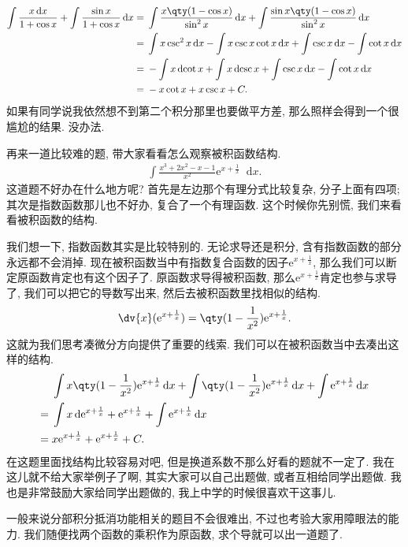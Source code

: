 \documentclass{ctexbook}
\newcommand{\e}{\mathrm{e}}
\newcommand*{\dif}{\mathop{}\!\mathrm{d}}
\begin{document}
{\begin{align*}
\int\frac{x\dif{x}}{1+\cos{x}}+\int\frac{\sin{x}}{1+\cos{x}}\dif{x}={}&\int\frac{x\qty(1-\cos{x})}{\sin^{2}{x}}\dif{x}+\int\frac{\sin{x}\qty(1-\cos{x})}{\sin^{2}{x}}\dif{x}\\
={}&\int x\csc^{2}{x}\dif{x}-\int x\csc{x}\cot{x}\dif{x}+\int\csc{x}\dif{x}-\int\cot{x}\dif{x}\\
={}&-\int x\dif{\cot{x}}+\int x\dif{\csc{x}}+\int\csc{x}\dif{x}-\int\cot{x}\dif{x}\\
={}&-x\cot{x}+x\csc{x}+C
.\end{align*}
如果有同学说我依然想不到第二个积分那里也要做平方差, 那么照样会得到一个很尴尬的结果. 没办法. \par
再来一道比较难的题, 带大家看看怎么观察被积函数结构. 
\begin{align*}
\int\frac{x^{3}+2x^{2}-x-1}{x^{2}}\e^{x+\frac{1}{x}}\dif{x}
.\end{align*}
这道题不好办在什么地方呢? 首先是左边那个有理分式比较复杂, 分子上面有四项; 其次是指数函数那儿也不好办, 复合了一个有理函数. 这个时候你先别慌, 我们来看看被积函数的结构. \par
我们想一下, 指数函数其实是比较特别的. 无论求导还是积分, 含有指数函数的部分永远都不会消掉. 现在被积函数当中有指数复合函数的因子$\e^{x+\frac{1}{x}}$, 那么我们可以断定原函数肯定也有这个因子了. 原函数求导得被积函数, 那么$\e^{x+\frac{1}{x}}$肯定也参与求导了, 我们可以把它的导数写出来, 然后去被积函数里找相似的结构. 
\begin{align*}
\dv{x}(\e^{x+\frac{1}{x}})=\qty(1-\frac{1}{x^{2}})\e^{x+\frac{1}{x}}
.\end{align*}
这就为我们思考凑微分方向提供了重要的线索. 我们可以在被积函数当中去凑出这样的结构. 
\begin{align*}
{}&\int x\qty(1-\frac{1}{x^{2}})\e^{x+\frac{1}{x}}\dif{x}+\int\qty(1-\frac{1}{x^{2}})\e^{x+\frac{1}{x}}\dif{x}+\int\e^{x+\frac{1}{x}}\dif{x}\\
={}&\int x\dif{\e^{x+\frac{1}{x}}}+\e^{x+\frac{1}{x}}+\int\e^{x+\frac{1}{x}}\dif{x}\\
={}&x\e^{x+\frac{1}{x}}+\e^{x+\frac{1}{x}}+C
.\end{align*}
在这题里面找结构比较容易对吧, 但是换道系数不那么好看的题就不一定了. 我在这儿就不给大家举例子了啊, 其实大家可以自己出题做, 或者互相给同学出题做. 我也是非常鼓励大家给同学出题做的, 我上中学的时候很喜欢干这事儿. \par
一般来说分部积分抵消功能相关的题目不会很难出, 不过也考验大家用障眼法的能力. 我们随便找两个函数的乘积作为原函数, 求个导就可以出一道题了. 
\begin{align*}

\end{align*}}
\end{document}

